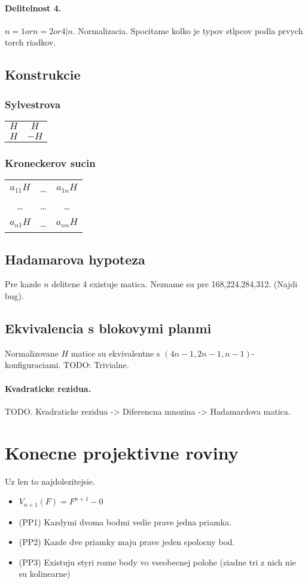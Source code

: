 \documentclass[10pt,a4paper]{article}
\begin{document}
\paragraph{Delitelnost 4.}
$n=1 or n=2 or 4|n$. Normalizacia. Spocitame kolko je typov stlpcov podla prvych torch riadkov. 

\subsection{Konstrukcie}
\subsubsection{Sylvestrova}
\begin{tabular}{c c}
$H$ & $H$ \\
$H$ & $-H$ \\
\end{tabular}
\subsubsection{Kroneckerov sucin}
\begin{tabular}{c c c}
$a_{11}H$ & \ldots & $a_{1n}H$ \\
\ldots & \ldots & \ldots \\
$a_{n1}H$ & \ldots & $a_{nn}H$ 
\end{tabular}

\subsection{Hadamarova hypoteza}
Pre kazde $n$ delitene 4 existuje matica.
Nezname su pre 168,224,284,312. (Najdi bug).  

\subsection{Ekvivalencia s blokovymi planmi}
Normalizovane $H$ matice su ekvivalentne s $(4n-1, 2n-1, n-1)$-konfiguraciami. 
TODO: Trivialne. 

\paragraph{Kvadraticke rezidua.}
TODO. Kvadraticke rezidua -> Diferencna mnozina -> Hadamardova matica. 

\section{Konecne projektivne roviny}
Uz len to najdolezitejsie. 
\begin{itemize}
\item $V_{n+1}(F) = F^{n+1} - {0}$
\item (PP1) Kazdymi dvoma bodmi vedie prave jedna priamka.
\item (PP2) Kazde dve priamky maju prave jeden spolocny bod. 
\item (PP3) Existuju styri rozne body vo vseobecnej polohe (ziadne tri z nich nie su kolinearne)
\end{itemize}
\end{document}
